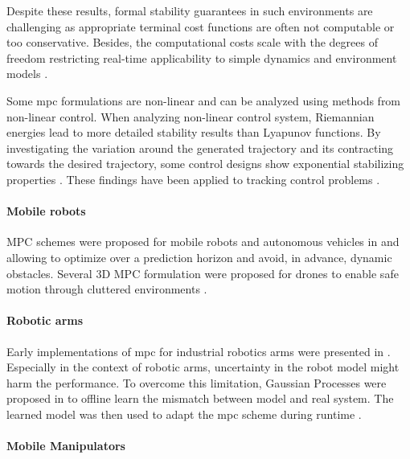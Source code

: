Despite these results, formal stability
guarantees in such environments are challenging as appropriate terminal cost
functions are often not computable or too conservative. Besides, the
computational costs scale with the degrees of freedom restricting real-time
applicability to simple dynamics and environment models \cite{Spahn2021}.

Some \ac{mpc} formulations are non-linear and can be analyzed
using methods from non-linear control. When analyzing non-linear control
system, Riemannian energies lead to more detailed stability results than
Lyapunov functions. By investigating the variation around the generated
trajectory and its contracting towards the desired trajectory, some control
designs show exponential stabilizing properties \cite{l2}. These
findings have been applied to tracking control problems \cite{l3}.

\paragraph{Mobile robots}

MPC schemes were proposed for mobile robots and autonomous vehicles in
\cite{Brito2019} and \cite{Schwarting2018} allowing to optimize over a
prediction horizon and avoid, in advance, dynamic obstacles.  Several 3D MPC
formulation were proposed for drones to enable safe motion through cluttered
environments \cite{Tordesillas2019,Liu2017}.

\paragraph{Robotic arms}

Early implementations of \ac{mpc} for industrial robotics
arms were presented in \cite{faulwasser2016implementation}.
Especially in the context of robotic arms, uncertainty in
the robot model might harm the performance. To overcome this
limitation, Gaussian Processes were proposed in
\cite{hewing2019cautious,carron2019data} to offline learn
the mismatch between model and real system. The learned
model was then used to adapt the \ac{mpc} scheme during
runtime \cite{carron2019data}.

\paragraph{Mobile Manipulators}

